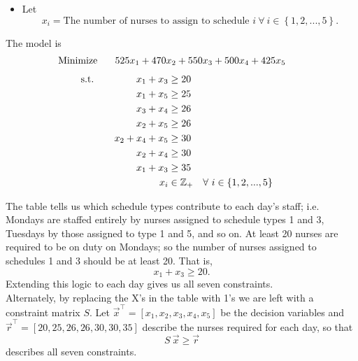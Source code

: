 \begin{itemize}
		\item Let 
		$$
		x_i = \textrm{The number of nurses to assign to schedule } i\ \forall\ i \in \left\lbrace 1,2,...,5 \right\rbrace.
		$$
\end{itemize}	
		\vspace{.25in}
		The model is
		\begin{align*}
		\textrm{Minimize}	\hspace{.25in}	525x_1+470x_2+550x_3+500x_4+425x_5&&&&
		\end{align*}
		\vspace{-.43in}
		\begin{align*}
		\textrm{s.t.} 		\hspace{.6in}	x_1+x_3 &\geq 20							\\
											x_1+x_5 &\geq 25							\\
											x_3+x_4 &\geq 26							\\
											x_2+x_5 &\geq 26							\\
										x_2+x_4+x_5 &\geq 30							\\
											x_2+x_4 &\geq 30							\\
											x_1+x_3 &\geq 35							\\
												x_i &\in \mathbb{Z}_+ & &\forall\ i \in \left\lbrace 1,2,...,5 \right\rbrace
		\end{align*}
		
		The table tells us which schedule types contribute to each day's staff; i.e. Mondays are staffed entirely by nurses assigned to schedule types 1 and 3, Tuesdays by those assigned to type 1 and 5, and so on. At least 20 nurses are required to be on duty on Mondays; so the number of nurses assigned to schedules 1 and 3 should be at least 20. That is,
			$$
			x_1+x_3 \geq 20.
			$$
		Extending this logic to each day gives us all seven constraints. \\
		
		Alternately, by replacing the X's in the table with 1's we are left with a constraint matrix $S$. Let $\vec{x}^\top = [x_1,x_2,x_3,x_4,x_5]$ be the decision variables and $\vec{r}^\top=[20,25,26,26,30,30,35]$ describe the nurses required for each day, so that
			$$
			S\ \vec{x} \geq \vec{r}
			$$
		describes all seven constraints. 
